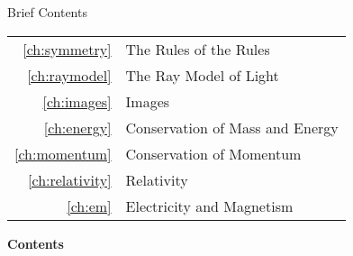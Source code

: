 \documentclass{dp}
\begin{document}
\myeqnspacing %
% 
\formatchtoc{\Large}{}{4mm}
\frontmatter
\yesiwantarabic
\renewcommand{\chapdir}{ch00}


\yesiwantarabic
\nomarginlayout
\onecolumn\pagebreak[4]
\noindent\huge\bfseries\sffamily{}\vspace{50mm}

\hspace{2.5mm}\noindent{}Brief Contents

\vspace{2mm}\hbox{}

\noindent\mynormaltype\Large\sffamily{}\begin{tabular}{rl}
\ref{ch:symmetry} & The Rules of the Rules \quad \pageref{ch:symmetry}\\
\ref{ch:raymodel} & The Ray Model of Light \quad \pageref{ch:raymodel}\\
\ref{ch:images} & Images \quad \pageref{ch:images}\\
\ref{ch:energy} & Conservation of Mass and Energy \quad \pageref{ch:energy}\\
\ref{ch:momentum} & Conservation of Momentum \quad \pageref{ch:momentum}\\
\ref{ch:relativity} & Relativity \quad \pageref{ch:relativity}\\
\ref{ch:em} & Electricity and Magnetism \quad \pageref{ch:em}\\
\end{tabular}
\vfill
\mynormaltype

\pagebreak[4]

\vspace{0mm}
\begin{center}
\noindent\huge\bfseries\sffamily{}Contents\mynormaltype
\end{center}
\vspace{0mm}
\begin{multicols}{2}
  \tableofcontents
  \setcounter{unbalance}{0}
\end{multicols}
\normallayout\onecolumn
\end{document}
